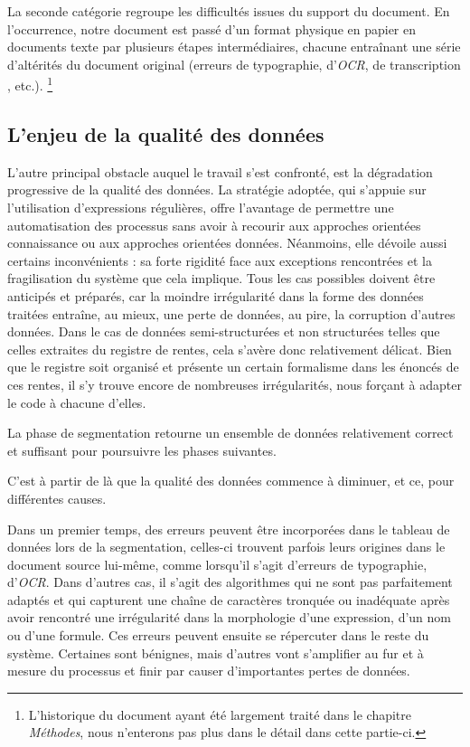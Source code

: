 La seconde catégorie regroupe les difficultés issues du support du document. 
En l'occurrence, notre document est passé d'un format physique en papier en documents texte par plusieurs étapes intermédiaires, chacune entraînant une série d'altérités du document original (erreurs de typographie, d'\textit{OCR}, de transcription , etc.). \footnote{L'historique du document ayant été  largement traité dans le chapitre \textit{Méthodes}, nous n'enterons pas plus dans le détail dans cette partie-ci.}

\subsection{L'enjeu de la qualité des données}
L'autre principal obstacle auquel le travail s'est confronté, est la dégradation progressive de la qualité des données.
La stratégie adoptée, qui s'appuie sur l'utilisation d'expressions régulières, offre l'avantage de permettre une automatisation des processus sans avoir à recourir aux approches orientées connaissance ou aux approches orientées données. Néanmoins, elle dévoile aussi certains inconvénients : sa forte rigidité face aux exceptions rencontrées et la fragilisation du système que cela implique. Tous les cas possibles doivent être anticipés et préparés, car la moindre irrégularité dans la forme des données traitées entraîne, au mieux, une perte de données, au pire, la corruption d'autres données. Dans le cas de données semi-structurées et non structurées telles que celles extraites du registre de rentes, cela s'avère donc relativement délicat. Bien que le registre soit organisé et présente un certain formalisme dans les énoncés de ces rentes, il s'y trouve encore de nombreuses irrégularités, nous forçant à adapter le code à chacune d'elles. 

La phase de segmentation retourne un ensemble de données relativement correct et suffisant pour poursuivre les phases suivantes.

C'est à partir de là que la qualité des données commence à diminuer, et ce, pour différentes causes.

Dans un premier temps, des erreurs peuvent être incorporées dans le tableau de données lors de la segmentation, celles-ci trouvent parfois leurs origines dans le document source lui-même, comme lorsqu'il s'agit d'erreurs de typographie, d'\textit{OCR}.
Dans d'autres cas, il s'agit des algorithmes qui ne sont pas parfaitement adaptés et qui capturent une chaîne de caractères tronquée ou inadéquate après avoir rencontré une irrégularité dans la morphologie d'une expression, d'un nom ou d'une formule.
Ces erreurs peuvent ensuite se répercuter dans le reste du système. Certaines sont bénignes, mais d'autres vont s'amplifier au fur et à mesure du processus et finir par causer d'importantes pertes de données. 

